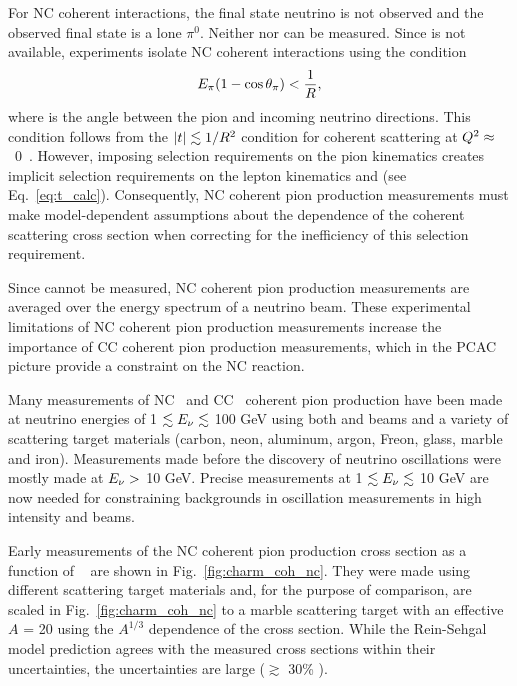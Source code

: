 For NC coherent interactions, the final state neutrino is not observed and the observed final state is a lone $\pi^{0}$.
Neither \enu nor \tabs can be measured.
Since \tabs is not available, experiments isolate NC coherent interactions using the condition
\begin{equation}
E_{\pi}(1-\cos\theta_{\pi}) < \frac{1}{R}, 
\end{equation}
where \thetapi is the angle between the pion and incoming neutrino directions.  This condition follows from the
$|t| \lesssim 1/R^2$ condition for coherent scattering at \mbox{$Q^{2}\approx$ 0 \cite{bib:lackner}}.  However, imposing
selection requirements on the pion kinematics creates implicit selection requirements on the lepton kinematics and
\qsq (see Eq.~\ref{eq:t_calc}).
Consequently, NC coherent pion production measurements must make model-dependent assumptions about the \qsq dependence of the
coherent scattering cross section when correcting for the inefficiency of this selection requirement.  

Since \enu cannot be measured, NC coherent pion production measurements are averaged over the energy spectrum of a neutrino
beam.  These experimental limitations of NC coherent pion production measurements increase the importance of CC coherent
pion production measurements, which in the PCAC picture provide a constraint on the NC reaction.

Many measurements of 
NC~\cite{bib:coh_nc_AP,bib:coh_nc_garg,bib:coh_nc_charm,bib:coh_nc_cc_skat,bib:coh_nc_fnal,bib:coh_nc_nomad,bib:coh_nc_sb,bib:coh_nc_mb,bib:coh_nc_minos}
and
CC~\cite{bib:coh_nc_cc_skat,bib:coh_cc_bebc1,bib:coh_cc_fnal1,bib:coh_cc_bebc2,bib:coh_cc_fnal2,bib:coh_cc_fnal3,bib:coh_cc_charm,
bib:coh_cc_k2k,bib:coh_cc_sb,bib:coh_cc_argo}
coherent pion production have been made at neutrino energies of 1 $\lesssim E_{\nu}\lesssim$ 100 GeV using both \numu and \numubar
beams and a variety of scattering target materials (carbon, neon, aluminum, argon, Freon, glass, marble and iron).  Measurements
made before the discovery of neutrino oscillations were mostly made at $E_{\nu}>$ 10 GeV.
Precise measurements at 1 $\lesssim E_{\nu}\lesssim$ 10 GeV are now needed for constraining backgrounds in
oscillation measurements in high intensity \numu and \numubar beams.

Early measurements of the NC coherent pion production cross section as a function of
\enu~\cite{bib:coh_nc_AP,bib:coh_nc_garg,bib:coh_nc_charm} are shown in Fig.~\ref{fig:charm_coh_nc}.  They were made
using different scattering target materials and, for the purpose of comparison, are scaled in Fig.~\ref{fig:charm_coh_nc}
to a marble scattering target with an effective $A$ = 20 using the $A^{1/3}$ dependence of the cross section.
While the Rein-Sehgal model prediction agrees with the measured cross sections within their uncertainties, the uncertainties
are large ($\gtrsim$ 30\% \cite{bib:coh_nc_nomad}).

